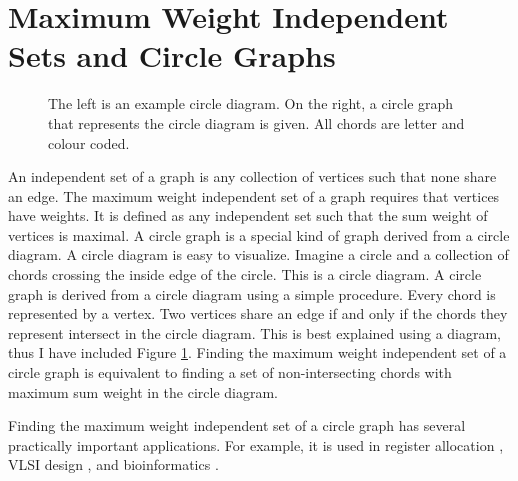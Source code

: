 \documentclass[12pt, a4paper]{article}
\begin{document}
\section{Maximum Weight Independent Sets and Circle Graphs}

\begin{figure}
\begin{center}
\end{center}
\caption{The left is an example circle diagram. On the right, a circle graph that represents the circle diagram is given. All chords are letter and colour coded.}
\label{fig:circle2graph}
\end{figure}

An independent set of a graph is any collection of vertices such that none share an edge. The maximum weight independent set of a graph requires that vertices have weights. It is defined as any independent set such that the sum weight of vertices is maximal. A circle graph is a special kind of graph derived from a circle diagram. A circle diagram is easy to visualize. Imagine a circle and a collection of chords crossing the inside edge of the circle. This is a circle diagram. A circle graph is derived from a circle diagram using a simple procedure. Every chord is represented by a vertex. Two vertices share an edge if and only if the chords they represent intersect in the circle diagram. This is best explained using a diagram, thus I have included Figure \ref{fig:circle2graph}. Finding the maximum weight independent set of a circle graph is equivalent to finding a set of non-intersecting chords with maximum sum weight in the circle diagram.

Finding the maximum weight independent set of a circle graph has several practically important applications. For example, it is used in register allocation \cite{de1999graph}, VLSI design \cite{cong1990over}, and bioinformatics \cite{swenson2009maximum}.
\end{document}
